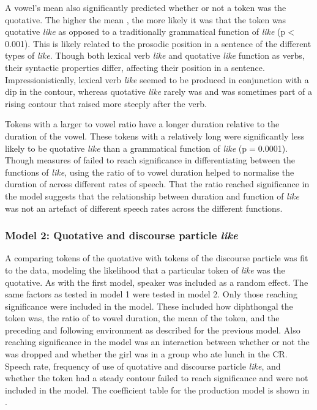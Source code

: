 \largerpage
A vowel's mean  also significantly predicted whether or not a token was the quotative. The higher the mean , the more likely it was that the token was quotative \textit{like} as opposed to a traditionally grammatical function of \textit{like} (p$<$0.001). This is likely related to the prosodic position in a sentence of the different types of \textit{like}. Though both lexical verb \textit{like} and quotative \textit{like} function as verbs, their syntactic properties differ, affecting their position in a sentence. Impressionistically, lexical verb \textit{like} seemed to be produced in conjunction with a dip in the  contour, whereas quotative \textit{like} rarely was and was sometimes part of a rising contour that raised more steeply after the verb. 

Tokens with a larger  to vowel ratio have a longer  duration relative to the duration of the vowel. These tokens with a relatively long  were significantly less likely to be quotative \textit{like} than a grammatical function of \textit{like} (p$=$0.0001). Though measures of  failed to reach significance in differentiating between the functions of \textit{like}, using the ratio of  to vowel duration helped to normalise the duration of  across different rates of speech. That the ratio reached significance in the model suggests that the relationship between  duration and function of \textit{like} was not an artefact of different speech rates across the different functions.  



\subsubsection{Model 2: Quotative and discourse particle \textit{like}}

A  comparing tokens of the quotative with tokens of the discourse particle was fit to the data, modeling the likelihood that a particular token of \textit{like} was the quotative. As with the first model, speaker was included as a random effect. The same factors as tested in model 1 were tested in model 2. Only those reaching significance were included in the model. These included how diphthongal the token was, the ratio of  to vowel duration, the mean  of the token, and the preceding and following environment as described for the previous model. Also reaching significance in the model was an interaction between whether or not the  was dropped and whether the girl was in a group who ate lunch in the CR. Speech rate, frequency of use of quotative and discourse particle \textit{like}, and whether the token had a steady  contour failed to reach significance and were not included in the model. The coefficient table for the production model is shown in . 
 
